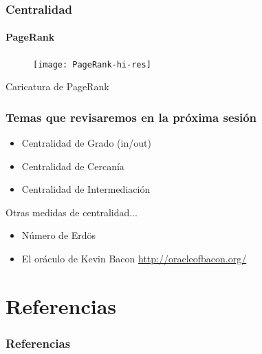 \documentclass[10pt]{beamer}
\begin{document}
\begin{frame}
\frametitle{Centralidad}
\framesubtitle{PageRank}
\begin{figure}
\centering
\texttt{[image: PageRank-hi-res]}
\end{figure}
{\footnotesize Caricatura de PageRank}
\end{frame}

\begin{frame}
\frametitle{Temas que revisaremos en la pr\'oxima sesi\'on}
\begin{itemize}
\item Centralidad de Grado (in/out)
\item Centralidad de Cercan\'ia
\item Centralidad de Intermediaci\'on
\end{itemize}
Otras medidas de centralidad...
\begin{itemize}
\item N\'umero de Erd{\"o}s 
\item El or\'aculo de Kevin Bacon \url{http://oracleofbacon.org/}
\end{itemize}
\end{frame}

\section{Referencias}
\begin{frame}
\frametitle{Referencias}


\end{frame}
\end{document}
